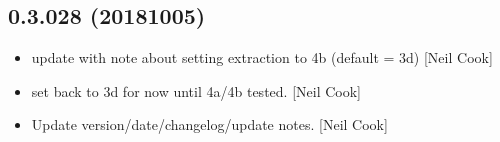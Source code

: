 \documentclass[a4paper,10pt,english]{report}
\begin{document}
\subsection{0.3.028 (2018\sphinxhyphen{}10\sphinxhyphen{}05)}
\label{\detokenize{misc/changelog:id323}}\begin{itemize}
\item {} 
 \sphinxhyphen{} update with note about setting extraction to 4b
(default = 3d) {[}Neil Cook{]}

\item {} 
 \sphinxhyphen{} set  back to 3d for now \sphinxhyphen{}
until 4a/4b tested. {[}Neil Cook{]}

\item {} 
Update \sphinxhyphen{} version/date/changelog/update notes. {[}Neil Cook{]}

\end{itemize}
\end{document}
